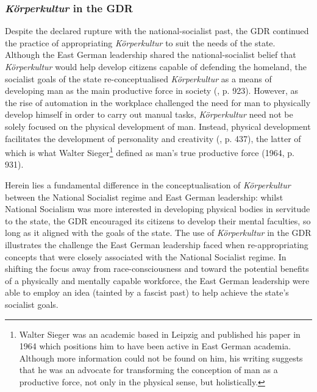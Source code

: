 \subsubsection*{\textit{Körperkultur} in the GDR}

Despite the declared rupture with the national-socialist past, the GDR continued the practice of appropriating \textit{Körperkultur} to suit the needs of the state. Although the East German leadership shared the national-socialist belief that \textit{Körperkultur} would help develop citizens capable of defending the homeland, the socialist goals of the state re-conceptualised \textit{Körperkultur} as a means of developing man as the main productive force in society (\cite{sieger1964}, p. 923). However, as the rise of automation in the workplace challenged the need for man to physically develop himself in order to carry out manual tasks, \textit{Körperkultur} need not be solely focused on the physical development of man. Instead, physical development facilitates the development of personality and creativity (\cite{bobnewa1963}, p. 437), the latter of which is what Walter Sieger\footnote{Walter Sieger was an academic based in Leipzig and published his paper in 1964 which positions him to have been active in East German academia. Although more information could not be found on him, his writing suggests that he was an advocate for transforming the conception of man as a productive force, not only in the physical sense, but holistically.} defined as man’s true productive force (1964, p. 931).

Herein lies a fundamental difference in the conceptualisation of \textit{Körperkultur} between the National Socialist regime and East German leadership: whilst National Socialism was more interested in developing physical bodies in servitude to the state, the GDR encouraged its citizens to develop their mental faculties, so long as it aligned with the goals of the state. The use of \textit{Körperkultur} in the GDR illustrates the challenge the East German leadership faced when re-appropriating concepts that were closely associated with the National Socialist regime. In shifting the focus away from race-consciousness and toward the potential benefits of a physically and mentally capable workforce, the East German leadership were able to employ an idea (tainted by a fascist past) to help achieve the state’s socialist goals.

